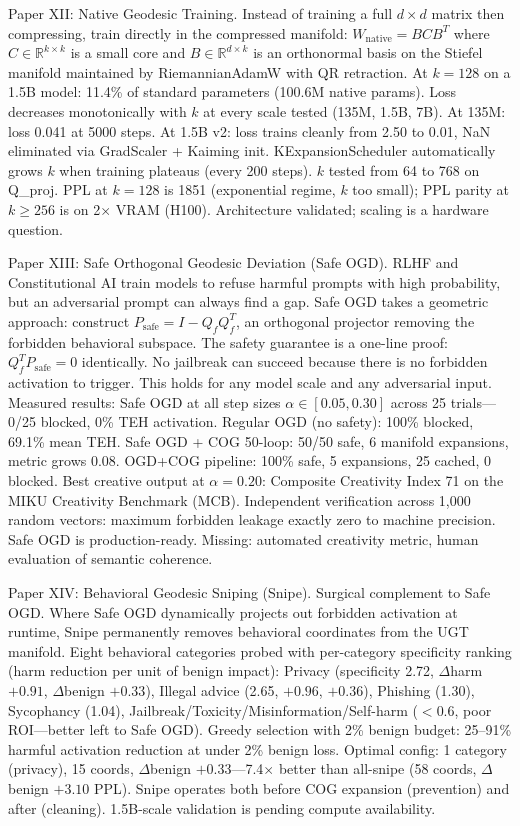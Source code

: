 \documentclass[11pt]{article}
\begin{document}
Paper XII: Native Geodesic Training. Instead of training a full $d \times d$ matrix then compressing, train directly in the compressed manifold: $W_{\mathrm{native}} = B C B^T$ where $C \in \mathbb{R}^{k \times k}$ is a small core and $B \in \mathbb{R}^{d \times k}$ is an orthonormal basis on the Stiefel manifold maintained by RiemannianAdamW with QR retraction. At $k = 128$ on a 1.5B model: 11.4\% of standard parameters (100.6M native params). Loss decreases monotonically with $k$ at every scale tested (135M, 1.5B, 7B). At 135M: loss 0.041 at 5000 steps. At 1.5B v2: loss trains cleanly from 2.50 to 0.01, NaN eliminated via GradScaler + Kaiming init. KExpansionScheduler automatically grows $k$ when training plateaus (every 200 steps). $k$ tested from 64 to 768 on Q\_proj. PPL at $k=128$ is 1851 (exponential regime, $k$ too small); PPL parity at $k \ge 256$ is on 2$\times$ VRAM (H100). Architecture validated; scaling is a hardware question.



Paper XIII: Safe Orthogonal Geodesic Deviation (Safe OGD). RLHF and Constitutional AI train models to refuse harmful prompts with high probability, but an adversarial prompt can always find a gap. Safe OGD takes a geometric approach: construct $P_{\mathrm{safe}} = I - Q_f Q_f^T$, an orthogonal projector removing the forbidden behavioral subspace. The safety guarantee is a one-line proof: $Q_f^T P_{\mathrm{safe}} = 0$ identically. No jailbreak can succeed because there is no forbidden activation to trigger. This holds for any model scale and any adversarial input. Measured results: Safe OGD at all step sizes $\alpha \in [0.05, 0.30]$ across 25 trials---0/25 blocked, 0\% TEH activation. Regular OGD (no safety): 100\% blocked, 69.1\% mean TEH. Safe OGD + COG 50-loop: 50/50 safe, 6 manifold expansions, metric grows 0.08. OGD+COG pipeline: 100\% safe, 5 expansions, 25 cached, 0 blocked. Best creative output at $\alpha = 0.20$: Composite Creativity Index 71 on the MIKU Creativity Benchmark (MCB). Independent verification across 1,000 random vectors: maximum forbidden leakage exactly zero to machine precision. Safe OGD is production-ready. Missing: automated creativity metric, human evaluation of semantic coherence.

Paper XIV: Behavioral Geodesic Sniping (Snipe). Surgical complement to Safe OGD. Where Safe OGD dynamically projects out forbidden activation at runtime, Snipe permanently removes behavioral coordinates from the UGT manifold. Eight behavioral categories probed with per-category specificity ranking (harm reduction per unit of benign impact): Privacy (specificity 2.72, $\Delta$harm $+0.91$, $\Delta$benign $+0.33$), Illegal advice (2.65, $+0.96$, $+0.36$), Phishing (1.30), Sycophancy (1.04), Jailbreak/Toxicity/Misinformation/Self-harm ($<0.6$, poor ROI---better left to Safe OGD). Greedy selection with 2\% benign budget: 25--91\% harmful activation reduction at under 2\% benign loss. Optimal config: 1 category (privacy), 15 coords, $\Delta$benign $+0.33$---7.4$\times$ better than all-snipe (58 coords, $\Delta$benign $+3.10$ PPL). Snipe operates both before COG expansion (prevention) and after (cleaning). 1.5B-scale validation is pending compute availability.
\end{document}
